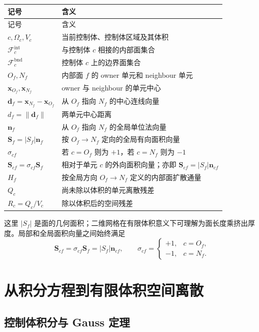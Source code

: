 \documentclass[UTF8,a4paper,11pt]{ctexart}
\newcommand{\vect}[1]{\bm{#1}}
\newcommand{\Sf}{\vect S_f}
\newcommand{\Scf}{\vect S_{cf}}
\newcommand{\df}{\vect d_f}
\newcommand{\nf}{\vect n_f}
\begin{document}
\begin{longtable}{>{\centering\arraybackslash}p{}p{}}
\toprule
记号 & 含义\\
\midrule
\endfirsthead
\toprule
记号 & 含义\\
\midrule
\endhead
\(c,\Omega_c,V_c\) & 当前控制体、控制体区域及其体积\\
\(\mathcal F_c^{\mathrm{int}}\) & 与控制体 \(c\) 相接的内部面集合\\
\(\mathcal F_c^{\mathrm{bnd}}\) & 控制体 \(c\) 上的边界面集合\\
\(O_f,N_f\) & 内部面 \(f\) 的 owner 单元和 neighbour 单元\\
\(\vect x_{O_f},\vect x_{N_f}\) & owner 与 neighbour 的单元中心\\
\(\df=\vect x_{N_f}-\vect x_{O_f}\) & 从 \(O_f\) 指向 \(N_f\) 的中心连线向量\\
\(d_f=\lVert\df\rVert\) & 两单元中心距离\\
\(\nf\) & 从 \(O_f\) 指向 \(N_f\) 的全局单位法向量\\
\(\Sf=|S_f|\nf\) & 按 \(O_f\to N_f\) 定向的全局有向面积向量\\
\(\sigma_{cf}\) & 若 \(c=O_f\) 则为 \(+1\)，若 \(c=N_f\) 则为 \(-1\)\\
\(\Scf=\sigma_{cf}\Sf\) & 相对于单元 \(c\) 的外向面积向量；亦即 \(\Scf=|S_f|\vect n_{cf}\)\\
\(H_f\) & 按全局方向 \(O_f\to N_f\) 定义的内部面扩散通量\\
\(Q_c\) & 尚未除以体积的单元离散残差\\
\(R_c=Q_c/V_c\) & 除以体积后的空间残差\\
\bottomrule
\end{longtable}

这里 \(|S_f|\) 是面的几何面积；二维网格在有限体积意义下可理解为面长度乘挤出厚度。局部和全局面积向量之间始终满足
\begin{equation}
  \Scf=\sigma_{cf}\Sf=|S_f|\vect n_{cf},
  \qquad
  \sigma_{cf}=
  \begin{cases}
  +1,&c=O_f,\\
  -1,&c=N_f.
  \end{cases}
  \label{eq:sigma}
\end{equation}

\section{从积分方程到有限体积空间离散}

\subsection{控制体积分与 Gauss 定理}
\end{document}
